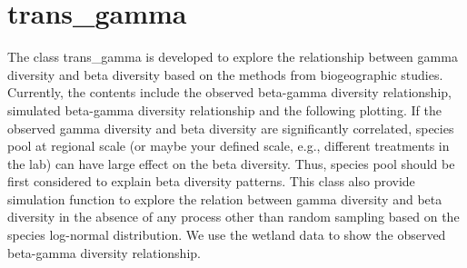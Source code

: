 \documentclass[
]{book}
\newenvironment{Shaded}{\begin{snugshade}}{\end{snugshade}}
\newcommand{\AttributeTok}[1]{\textcolor[rgb]{0.77,0.63,0.00}{#1}}
\newcommand{\CommentTok}[1]{\textcolor[rgb]{0.56,0.35,0.01}{\textit{#1}}}
\newcommand{\ConstantTok}[1]{\textcolor[rgb]{0.00,0.00,0.00}{#1}}
\newcommand{\DecValTok}[1]{\textcolor[rgb]{0.00,0.00,0.81}{#1}}
\newcommand{\FunctionTok}[1]{\textcolor[rgb]{0.00,0.00,0.00}{#1}}
\newcommand{\NormalTok}[1]{#1}
\newcommand{\OtherTok}[1]{\textcolor[rgb]{0.56,0.35,0.01}{#1}}
\newcommand{\SpecialCharTok}[1]{\textcolor[rgb]{0.00,0.00,0.00}{#1}}
\newcommand{\StringTok}[1]{\textcolor[rgb]{0.31,0.60,0.02}{#1}}
\begin{document}
\hypertarget{trans_gamma}{%
\section{trans\_gamma}\label{trans_gamma}}

The class trans\_gamma is developed to explore the relationship between gamma diversity and beta diversity
based on the methods from biogeographic studies\citep{Zhang_Local_2020}.
Currently, the contents include the observed beta-gamma diversity relationship, simulated beta-gamma diversity relationship and the following plotting.
If the observed gamma diversity and beta diversity are significantly correlated,
species pool at regional scale (or maybe your defined scale, e.g., different treatments in the lab) can have large effect on the beta diversity.
Thus, species pool should be first considered to explain beta diversity patterns.
This class also provide simulation function to explore the relation between gamma diversity and beta diversity in the absence of any process
other than random sampling based on the species log-normal distribution.
We use the wetland data to show the observed beta-gamma diversity relationship.

\begin{Shaded}
\end{Shaded}
\end{document}
